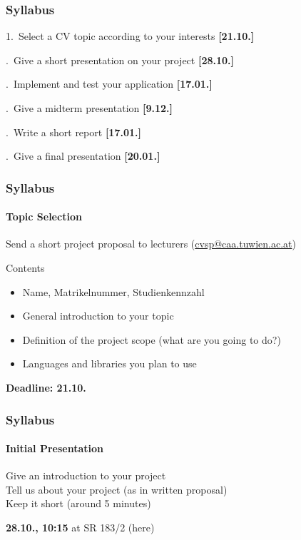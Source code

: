 \documentclass[xetex,professionalfont]{beamer}
\newcommand{\highlight}[1]{\textcolor{tuwcvl_inf_red}{\textbf{#1}}}
\begin{document}

\begin{frame}
\frametitle{Syllabus}

1.\ Select a CV topic according to your interests \highlight{[21.10.]}

.\ Give a short presentation on your project \highlight{[28.10.]}

.\ Implement and test your application \highlight{[17.01.]}

.\ Give a midterm presentation \highlight{[9.12.]}

.\ Write a short report \highlight{[17.01.]}

.\ Give a final presentation \highlight{[20.01.]}

\end{frame}


\begin{frame}
\frametitle{Syllabus}
\framesubtitle{Topic Selection}

Send a short project proposal to lecturers (\url{cvsp@caa.tuwien.ac.at})

\bigskip
Contents
\begin{itemize}
	\item Name, Matrikelnummer, Studienkennzahl
	\item General introduction to your topic
	\item Definition of the project scope (what are you going to do?)
	\item Languages and libraries you plan to use
\end{itemize}

\bigskip
\highlight{Deadline: 21.10.}

\end{frame}


\begin{frame}
\frametitle{Syllabus}
\framesubtitle{Initial Presentation}

Give an introduction to your project\\\medskip
Tell us about your project (as in written proposal)\\\medskip
Keep it short (around 5 minutes)

\bigskip
\highlight{28.10., 10:15} at SR 183/2 (here)

\end{frame}
\end{document}
